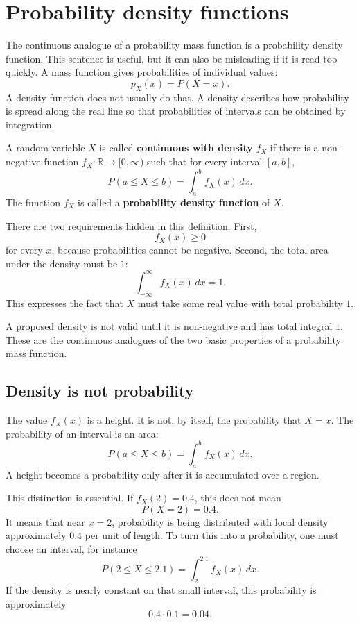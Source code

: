 \section{Probability density functions}

The continuous analogue of a probability mass function is a probability density
function. This sentence is useful, but it can also be misleading if it is read
too quickly. A mass function gives probabilities of individual values:
\[
p_X(x)=P(X=x).
\]
A density function does not usually do that. A density describes how probability
is spread along the real line so that probabilities of intervals can be obtained
by integration.

\begin{definitionbox}
A random variable \(X\) is called \textbf{continuous with density} \(f_X\) if
there is a non-negative function \(f_X:\mathbb{R}\to[0,\infty)\) such that for
every interval \([a,b]\),
\[
P(a\leq X\leq b)=\int_a^b f_X(x)\,dx.
\]
The function \(f_X\) is called a \textbf{probability density function} of \(X\).
\end{definitionbox}

There are two requirements hidden in this definition. First,
\[
f_X(x)\geq 0
\]
for every \(x\), because probabilities cannot be negative. Second, the total
area under the density must be \(1\):
\[
\int_{-\infty}^{\infty} f_X(x)\,dx=1.
\]
This expresses the fact that \(X\) must take some real value with total
probability \(1\).

\begin{remarkbox}
A proposed density is not valid until it is non-negative and has total integral
\(1\). These are the continuous analogues of the two basic properties of a
probability mass function.
\end{remarkbox}

\subsection*{Density is not probability}

The value \(f_X(x)\) is a height. It is not, by itself, the probability that
\(X=x\). The probability of an interval is an area:
\[
P(a\leq X\leq b)=\int_a^b f_X(x)\,dx.
\]
A height becomes a probability only after it is accumulated over a region.

This distinction is essential. If \(f_X(2)=0.4\), this does not mean
\[
P(X=2)=0.4.
\]
It means that near \(x=2\), probability is being distributed with local density
approximately \(0.4\) per unit of length. To turn this into a probability, one
must choose an interval, for instance
\[
P(2\leq X\leq 2.1)=\int_2^{2.1} f_X(x)\,dx.
\]
If the density is nearly constant on that small interval, this probability is
approximately
\[
0.4\cdot 0.1=0.04.
\]

